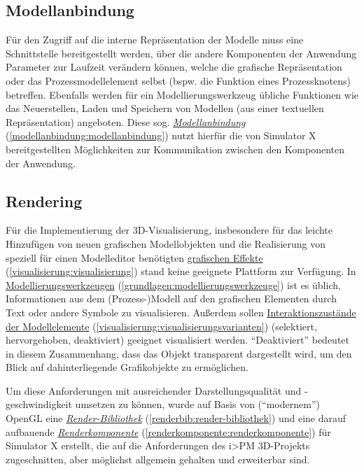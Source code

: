 \documentclass[a4paper,10pt]{sphinxmanual}
\begin{document}
\subsection{Modellanbindung}
\label{einleitung:modellanbindung}
Für den Zugriff auf die interne Repräsentation der Modelle muss eine Schnittstelle bereitgestellt werden, über die andere Komponenten der Anwendung Parameter zur Laufzeit verändern können, welche die grafische Repräsentation oder das Prozessmodellelement selbst (bspw. die Funktion eines Prozessknotens) betreffen.
Ebenfalls werden für ein Modellierungswerkzeug übliche Funktionen wie das Neuerstellen, Laden und Speichern von Modellen (aus einer textuellen Repräsentation) angeboten.
Diese sog. {\hyperref[modellanbindung:modellanbindung]{\emph{Modellanbindung}}} (\autoref*{modellanbindung:modellanbindung}) nutzt hierfür die von Simulator X bereitgestellten Möglichkeiten zur Kommunikation zwischen den Komponenten der Anwendung.


\subsection{Rendering}
\label{einleitung:rendering}
Für die Implementierung der 3D-Visualisierung, insbesondere für das leichte Hinzufügen von neuen grafischen Modellobjekten und die Realisierung von speziell für einen Modelleditor benötigten {\hyperref[visualisierung:visualisierung]{grafischen Effekte}} (\autoref*{visualisierung:visualisierung}) stand keine geeignete Plattform zur Verfügung.
In {\hyperref[grundlagen:modellierungswerkzeuge]{Modellierungswerkzeugen}} (\autoref*{grundlagen:modellierungswerkzeuge}) ist es üblich, Informationen aus dem (Prozess-)Modell auf den grafischen Elementen durch Text oder andere Symbole zu visualisieren.
Außerdem sollen {\hyperref[visualisierung:visualisierungsvarianten]{Interaktionszustände der Modellelemente}} (\autoref*{visualisierung:visualisierungsvarianten}) (selektiert, hervorgehoben, deaktiviert) geeignet visualisiert werden.
"`Deaktiviert"' bedeutet in diesem Zusammenhang, dass das Objekt transparent dargestellt wird, um den Blick auf dahinterliegende Grafikobjekte zu ermöglichen.

Um diese Anforderungen mit ausreichender Darstellungsqualität und -geschwindigkeit umsetzen zu können, wurde auf Basis von ("`modernem"') OpenGL eine {\hyperref[renderbib:render-bibliothek]{\emph{Render-Bibliothek}}} (\autoref*{renderbib:render-bibliothek}) und eine darauf aufbauende {\hyperref[renderkomponente:renderkomponente]{\emph{Renderkomponente}}} (\autoref*{renderkomponente:renderkomponente}) für Simulator X erstellt, die auf die Anforderungen des i\textgreater{}PM 3D-Projekts zugeschnitten, aber möglichst allgemein gehalten und erweiterbar sind.
\end{document}
